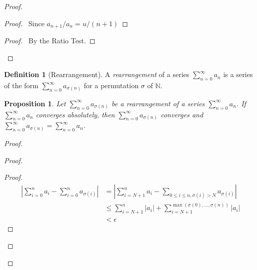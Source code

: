 \documentclass{article}
\let\qed\relax
\newtheorem{proposition}[axiom]{Proposition}
\theoremstyle{definition}
\newtheorem{definition}[axiom]{Definition}
\begin{document}
\begin{proof}
    \pf
    \begin{proof}
        \pf\ Since $a_{n+1}/a_n = u/(n+1)$
    \end{proof}
    \begin{proof}
        \pf\ By the Ratio Test.
    \end{proof}
    \qed
\end{proof}

\begin{definition}[Rearrangement]
    A \emph{rearrangement} of a series $\sum_{n=0}^\infty a_n$ is a series of the form $\sum_{n=0}^\infty a_{\sigma(n)}$ for a
    permutation $\sigma$ of $\mathbb{N}$.
\end{definition}

\begin{proposition}
    Let $\sum_{n=0}^\infty a_{\sigma(n)}$ be a rearrangement of a series  $\sum_{n=0}^\infty a_n$. If  $\sum_{n=0}^\infty a_n$ 
    converges absolutely, then $\sum_{n=0}^\infty a_{\sigma(n)}$ converges and $\sum_{n=0}^\infty a_{\sigma(n)} = \sum_{n=0}^\infty a_n$.
\end{proposition}

\begin{proof}
    \pf
    \begin{proof}
        \begin{proof}
            \pf
            \begin{align*}
                |\sum_{i=0}^n a_i - \sum_{i=0}^n a_{\sigma(i)}|
                & = |\sum_{i=N+1}^n a_i - \sum_{0 \leq i \leq n, \sigma(i) > N} a_{\sigma(i)}| \\
                & \leq \sum_{i=N+1}^n |a_i| + \sum_{i=N+1}^{\max(\sigma(0), \ldots, \sigma(n))} |a_i| \\
                & < \epsilon
            \end{align*}
        \end{proof}
    \end{proof}
    \qed
\end{proof}
\end{document}
